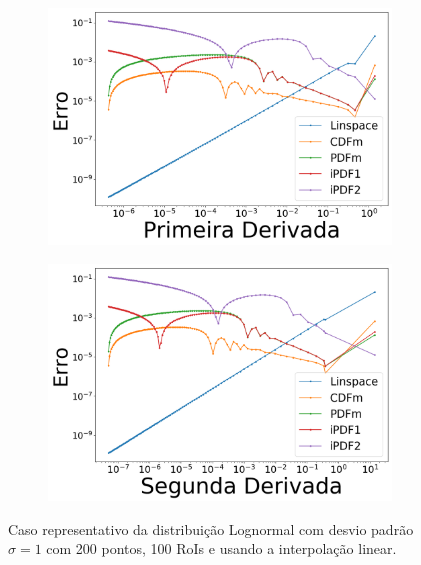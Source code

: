 \begin{figure}[H]
	\begin{subfigure}[b]{0.45\textwidth}
		\centering 
		\includegraphics[width=\textwidth]{./figuras/error_lognormal_linear_Primeira_Derivada_1.png}
		\caption{}
		\label{fig:error_log_lin_deriv}
	\end{subfigure}
	\hfill
	\begin{subfigure}[b]{0.45\textwidth}
		\centering 
		\includegraphics[width=\textwidth]{./figuras/error_lognormal_linear_Segunda_Derivada_1.png}
		\caption{}
		\label{fig:error_log_lin_deriv2}
	\end{subfigure}
	\caption{Caso representativo da distribuição Lognormal com desvio padrão $ \sigma = 1 $ com 200 pontos, 100 RoIs e usando a interpolação linear.}
	\label{fig:error_lognormal_linear}
\end{figure}

